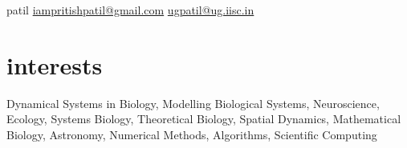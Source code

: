 \documentclass[11pt]{friggeri-cv}
\begin{document}
 {patil} 
        {\href{mailto:iampritishpatil@gmail.com}{iampritishpatil@gmail.com}\quad  
    \href{mailto:ugpatil@ug.iisc.in}{ugpatil@ug.iisc.in}
}





\section{interests}

Dynamical Systems in Biology, Modelling Biological Systems, Neuroscience, Ecology, Systems Biology, Theoretical Biology, Spatial Dynamics, Mathematical Biology, Astronomy, Numerical Methods, Algorithms, Scientific Computing
\end{document}
